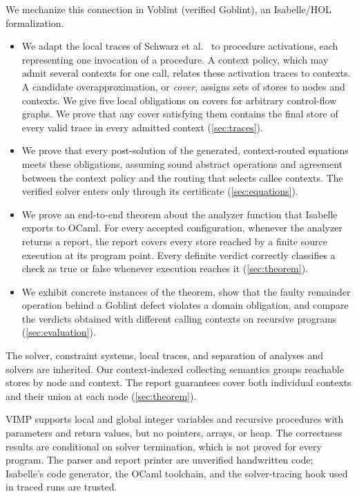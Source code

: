 We mechanize this connection in Voblint (verified Goblint), an Isabelle/HOL
formalization.
\begin{itemize}
  \item We adapt the local traces of Schwarz et al.~\cite{schwarz21} to
    procedure activations, each representing one invocation of a procedure. A context policy, which may admit several contexts
    for one call, relates these activation traces to contexts. A candidate overapproximation, or \emph{cover}, assigns sets of stores to
    nodes and contexts. We give five local obligations on covers for arbitrary
    control-flow graphs. We prove that any cover satisfying them contains the final store of every valid trace
    in every admitted context (\cref{sec:traces}).
  \item We prove that every post-solution of the generated, context-routed
    equations meets these obligations, assuming sound abstract operations and
    agreement between the context policy and the routing that selects callee contexts. The verified solver enters only through its
    certificate (\cref{sec:equations}).
  \item We prove an end-to-end theorem about the analyzer function that
    Isabelle exports to OCaml. For every accepted configuration, whenever the
    analyzer returns a report, the report covers every store reached by a finite source
    execution at its program point. Every definite verdict correctly classifies
    a check as true or false whenever execution reaches it (\cref{sec:theorem}).
  \item We exhibit concrete instances of the theorem, show that the faulty
    remainder operation behind a Goblint defect violates a domain obligation,
    and compare the verdicts obtained with different calling contexts on
    recursive programs (\cref{sec:evaluation}).
\end{itemize}
The solver, constraint systems, local traces, and separation of analyses and
solvers are inherited. Our context-indexed collecting semantics groups
reachable stores by node and context. The report guarantees cover both
individual contexts and their union at each node (\cref{sec:theorem}).

VIMP supports local and global integer variables and recursive procedures with
parameters and return values, but no pointers, arrays, or heap. The correctness
results are conditional on solver termination, which is not proved for every
program. The parser and report printer are unverified handwritten code;
Isabelle's code generator, the OCaml toolchain, and the solver-tracing hook
used in traced runs are trusted.
